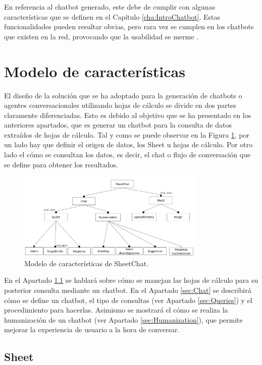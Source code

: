 En referencia al chatbot generado, este debe de cumplir con algunas características que se definen en el Capítulo \ref{cha:IntroChatbot}. Estas funcionalidades pueden resultar obvias, pero rara vez se cumplen en los chatbots que existen en la red, provocando que la usabilidad se merme \cite{Chan2016}.

\section{Modelo de características}
\label{sec:FeatureModel}

El diseño de la solución que se ha adoptado para la generación de chatbots o agentes conversacionales utilizando hojas de cálculo se divide en dos partes claramente diferenciadas. Esto es debido al objetivo que se ha presentado en los anteriores apartados, que es generar un chatbot para la consulta de datos extraídos de hojas de cálculo. Tal y como se puede observar en la Figura \ref{fig:FeatureModel}, por un lado hay que definir el origen de datos, los Sheet u hojas de cálculo. Por otro lado el cómo se consultan los datos, es decir, el chat o flujo de conversación que se define para obtener los resultados.


\begin{figure}[htb]
	\centering
	\includegraphics[width=0.8\textwidth]{./figs/FeatureModel.png}
	\caption{Modelo de características de SheetChat.}
	\label{fig:FeatureModel}
\end{figure}

En el Apartado \ref{sec:Sheet} se hablará sobre cómo se manejan las hojas de cálculo para su posterior consulta mediante un chatbot. En el Apartado \ref{sec:Chat} se describirá cómo se define un chatbot, el tipo de consultas (ver Apartado \ref{sec:Queries}) y el procedimiento para hacerlas. Asimismo se mostrará el cómo se realiza la humanización de un chatbot (ver Apartado \ref{sec:Humanization}), que permite mejorar la experiencia de usuario a la hora de conversar.

\subsection{Sheet}
\label{sec:Sheet}

